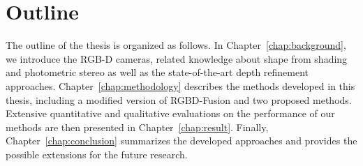 \section{Outline}
The outline of the thesis is organized as follows.
In Chapter~\ref{chap:background}, we introduce the RGB-D cameras, related knowledge about shape from shading and photometric stereo as well as the state-of-the-art depth refinement approaches.
Chapter~\ref{chap:methodology} describes the methods developed in this thesis, including a modified version of RGBD-Fusion and two proposed methods. 
Extensive quantitative and qualitative evaluations on the performance of our methods are then presented in Chapter~\ref{chap:result}.
Finally, Chapter~\ref{chap:conclusion} summarizes the developed approaches and provides the possible extensions for the future research.


